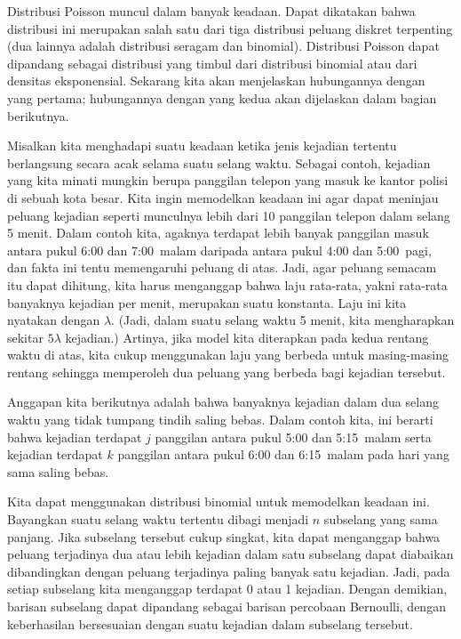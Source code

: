 Distribusi Poisson muncul dalam banyak keadaan. Dapat dikatakan bahwa distribusi ini
merupakan salah satu dari tiga distribusi peluang diskret terpenting (dua lainnya adalah
distribusi seragam dan binomial). Distribusi Poisson dapat dipandang sebagai distribusi
yang timbul dari distribusi binomial atau dari densitas eksponensial. Sekarang kita akan
menjelaskan hubungannya dengan yang pertama; hubungannya dengan yang kedua akan dijelaskan
dalam bagian berikutnya.
\par Misalkan kita menghadapi suatu keadaan ketika jenis kejadian tertentu berlangsung
secara acak selama suatu selang waktu. Sebagai contoh, kejadian yang kita minati mungkin
berupa panggilan telepon yang masuk ke kantor polisi di sebuah kota besar. Kita ingin
memodelkan keadaan ini agar dapat meninjau peluang kejadian seperti munculnya lebih dari
10 panggilan telepon dalam selang 5 menit. Dalam contoh kita, agaknya terdapat lebih
banyak panggilan masuk antara pukul 6:00 dan 7:00~{\footnotesize malam} daripada antara
pukul 4:00 dan 5:00~{\footnotesize pagi}, dan fakta ini tentu memengaruhi peluang di atas.
Jadi, agar peluang semacam itu dapat dihitung, kita harus menganggap bahwa laju rata-rata,
yakni rata-rata banyaknya kejadian per menit, merupakan suatu konstanta. Laju ini kita
nyatakan dengan $\lambda$. (Jadi, dalam suatu selang waktu 5 menit, kita mengharapkan
sekitar $5\lambda$ kejadian.) Artinya, jika model kita diterapkan pada kedua rentang waktu
di atas, kita cukup menggunakan laju yang berbeda untuk masing-masing rentang sehingga
memperoleh dua peluang yang berbeda bagi kejadian tersebut.
\par Anggapan kita berikutnya adalah bahwa banyaknya kejadian dalam dua selang waktu yang
tidak tumpang tindih saling bebas. Dalam contoh kita, ini berarti bahwa kejadian terdapat
$j$ panggilan antara pukul 5:00 dan 5:15~{\footnotesize malam} serta kejadian terdapat $k$
panggilan antara pukul 6:00 dan 6:15~{\footnotesize malam} pada hari yang sama saling
bebas.
\par Kita dapat menggunakan distribusi binomial untuk memodelkan keadaan ini. Bayangkan
suatu selang waktu tertentu dibagi menjadi $n$ subselang yang sama panjang. Jika
subselang tersebut cukup singkat, kita dapat menganggap bahwa peluang terjadinya dua atau
lebih kejadian dalam satu subselang dapat diabaikan dibandingkan dengan peluang terjadinya
paling banyak satu kejadian. Jadi, pada setiap subselang kita menganggap terdapat 0 atau 1
kejadian. Dengan demikian, barisan subselang dapat dipandang sebagai barisan percobaan
Bernoulli, dengan keberhasilan bersesuaian dengan suatu kejadian dalam subselang tersebut.
